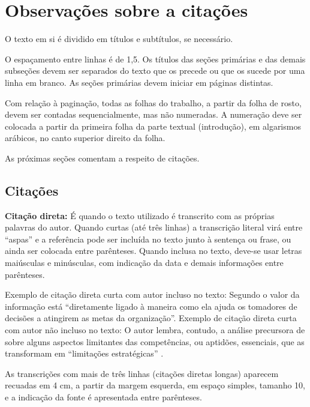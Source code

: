 \section{Observações sobre a citações}\label{sec:formatacaoTexto}

O texto em si é dividido em títulos e subtítulos, se necessário.

O espaçamento entre linhas é de 1,5. Os títulos das seções primárias e das demais subseções devem ser separados do texto que os precede ou que os sucede por uma linha em branco. As seções primárias devem iniciar em páginas distintas.

Com relação à paginação, todas as folhas do trabalho, a partir da folha de rosto, devem ser contadas sequencialmente, mas não numeradas. A numeração deve ser colocada a partir da primeira folha da parte textual (introdução), em algarismos arábicos, no canto superior direito da folha.


As próximas seções comentam a respeito de citações.

\subsection{Citações}\label{subsec:citacoes}

\textbf{Citação direta:} É quando o texto utilizado é transcrito com as próprias palavras do autor. Quando curtas (até três linhas) a transcrição literal virá entre “aspas” e a referência pode ser incluída no texto junto à sentença ou frase, ou ainda ser colocada entre parênteses. Quando inclusa no texto, deve-se usar letras maiúsculas e minúsculas, com indicação da data e demais informações entre parênteses.

Exemplo de citação direta curta com autor incluso no texto: Segundo  o valor da informação está “diretamente ligado à maneira como ela ajuda os tomadores de decisões a atingirem as metas da organização”. Exemplo de citação direta curta com autor não incluso no texto: O autor lembra, contudo, a análise precursora de  sobre alguns aspectos limitantes das competências, ou aptidões, essenciais, que as transformam em “limitações estratégicas” \cite{Pressman2009}.

As transcrições com mais de três linhas (citações diretas longas) aparecem recuadas em 4 cm, a partir da margem esquerda, em espaço simples, tamanho 10, e a indicação da fonte é apresentada entre parênteses.

